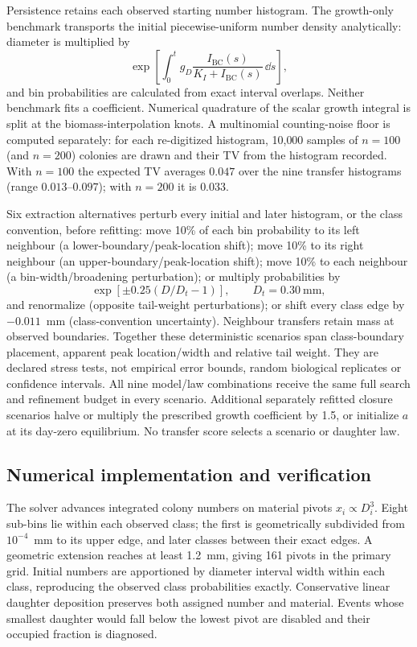 Persistence retains each observed starting number histogram. The growth-only benchmark transports the initial piecewise-uniform number density analytically: diameter is multiplied by
\[
 \exp\left[\int_0^t g_D\frac{I_{\mathrm{BC}}(s)}{K_I+I_{\mathrm{BC}}(s)}\,\dd s\right],
\]
and bin probabilities are calculated from exact interval overlaps. Neither benchmark fits a coefficient. Numerical quadrature of the scalar growth integral is split at the biomass-interpolation knots. A multinomial counting-noise floor is computed separately: for each re-digitized histogram, 10{,}000 samples of $n=100$ (and $n=200$) colonies are drawn and their TV from the histogram recorded. With $n=100$ the expected TV averages $0.047$ over the nine transfer histograms (range $0.013$--$0.097$); with $n=200$ it is $0.033$.

Six extraction alternatives perturb every initial and later histogram, or the class convention, before refitting: move 10\% of each bin probability to its left neighbour (a lower-boundary/peak-location shift); move 10\% to its right neighbour (an upper-boundary/peak-location shift); move 10\% to each neighbour (a bin-width/broadening perturbation); or multiply probabilities by
\[
 \exp[\pm0.25(D/D_t-1)],\qquad D_t=0.30~\mathrm{mm},
\]
and renormalize (opposite tail-weight perturbations); or shift every class edge by $-0.011$~mm (class-convention uncertainty). Neighbour transfers retain mass at observed boundaries. Together these deterministic scenarios span class-boundary placement, apparent peak location/width and relative tail weight. They are declared stress tests, not empirical error bounds, random biological replicates or confidence intervals. All nine model/law combinations receive the same full search and refinement budget in every scenario. Additional separately refitted closure scenarios halve or multiply the prescribed growth coefficient by 1.5, or initialize $a$ at its day-zero equilibrium. No transfer score selects a scenario or daughter law.

\subsection{Numerical implementation and verification}

The solver advances integrated colony numbers on material pivots $x_i\propto D_i^3$. Eight sub-bins lie within each observed class; the first is geometrically subdivided from $10^{-4}$~mm to its upper edge, and later classes between their exact edges. A geometric extension reaches at least 1.2~mm, giving 161 pivots in the primary grid. Initial numbers are apportioned by diameter interval width within each class, reproducing the observed class probabilities exactly. Conservative linear daughter deposition preserves both assigned number and material. Events whose smallest daughter would fall below the lowest pivot are disabled and their occupied fraction is diagnosed.

